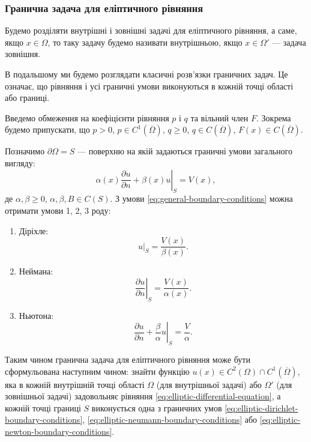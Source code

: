 \subsubsection{Гранична задача для еліптичного рівняння}

Будемо розділяти внутрішні і зовнішні задачі для еліптичного рівняння, а саме, якщо $x \in \Omega$, то таку задачу будемо називати внутрішньою, якщо $x \in \Omega'$ --- задача зовнішня. \medskip

В подальшому ми будемо розглядати класичні розв'язки граничних задач. Це означає, що рівняння і усі граничні умови виконуються в кожній точці області або границі. \medskip

Введемо обмеження на коефіцієнти рівняння $p$ і $q$ та вільний член $F$. Зокрема будемо припускати, що $p > 0$, $p \in C^1 \left(\overline \Omega\right)$, $q \ge 0$, $q \in C \left(\overline \Omega\right)$, $F(x) \in C \left(\overline \Omega\right)$. \medskip

Позначимо $\partial \Omega = S$ --- поверхню на якій задаються граничні умови загального
вигляду:
\begin{equation}
    \label{eq:general-boundary-conditions}
    \left. \alpha(x) \frac{\partial u}{\partial n} + \beta(x) u \right|_S = V(x),
\end{equation}
де $\alpha, \beta \ge 0$, $\alpha, \beta, B \in C(S)$. З умови \eqref{eq:general-boundary-conditions} можна отримати умови 1, 2, 3 роду:
\begin{enumerate}
    \item Діріхле:
    \begin{equation}
        \label{eq:elliptic-dirichlet-boundary-conditions}
        \left. u \right|_S = \frac{V(x)}{\beta(x)}.
    \end{equation}
    \item Неймана:
    \begin{equation}
        \label{eq:elliptic-neumann-boundary-conditions}
        \left. \frac{\partial u}{\partial n} \right|_S = \frac{V(x)}{\alpha(x)}.
    \end{equation}
    \item Ньютона:
    \begin{equation}
        \label{eq:elliptic-newton-boundary-conditions}
        \left. \frac{\partial u}{\partial n} + \frac{\beta}{\alpha} u \right|_S = \frac{V}{\alpha}.
    \end{equation}
\end{enumerate}

Таким чином гранична задача для еліптичного рівняння може бути сформульована наступним чином: знайти функцію $u(x) \in C^2(\Omega) \cap C^1 \left( \overline \Omega \right)$, яка в кожній внутрішній точці області $\Omega$ (для внутрішньої задачі) або $\Omega'$ (для зовнішньої задачі) задовольняє рівняння \eqref{eq:elliptic-differential-equation}, а кожній точці границі $S$ виконується одна з граничних умов \eqref{eq:elliptic-dirichlet-boundary-conditions}, \eqref{eq:elliptic-neumann-boundary-conditions} або \eqref{eq:elliptic-newton-boundary-conditions}. \medskip

